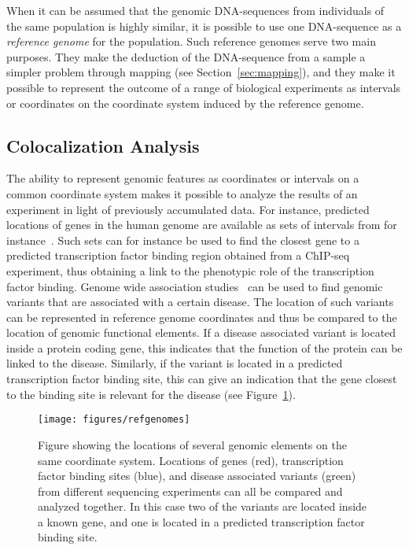 When it can be assumed that the genomic DNA-sequences from individuals of the same population is highly similar, it is possible to use one DNA-sequence as a \emph{reference genome} for the population.
Such reference genomes serve two main purposes.
They make the deduction of the DNA-sequence from a sample a simpler problem through mapping (see Section~\ref{sec:mapping}), and they make it possible to represent the outcome of a range of biological experiments as intervals or coordinates on the coordinate system induced by the reference genome. 

\subsection{Colocalization Analysis}
The ability to represent genomic features as coordinates or intervals on a common coordinate system makes it possible to analyze the results of an experiment in light of previously accumulated data.
For instance, predicted locations of genes in the human genome are available as sets of intervals from for instance~\cite{genelist}.
Such sets can for instance be used to find the closest gene to a predicted transcription factor binding region obtained from a ChIP-seq experiment, thus obtaining a link to the phenotypic role of the transcription factor binding.
Genome wide association studies~\cite{gwas} can be used to find genomic variants that are associated with a certain disease.
The location of such variants can be represented in reference genome coordinates and thus be compared to the location of genomic functional elements.
If a disease associated variant is located inside a protein coding gene, this indicates that the function of the protein can be linked to the disease.
Similarly, if the variant is located in a predicted transcription factor binding site, this can give an indication that the gene closest to the binding site is relevant for the disease (see Figure~\ref{fig:refpos}).
\begin{figure}
  \texttt{[image: figures/refgenomes]}
  \caption{Figure showing the locations of several genomic elements on the same coordinate system.
    Locations of genes (red), transcription factor binding sites (blue), and disease associated variants (green) from different sequencing experiments can all be compared and analyzed together.
    In this case two of the variants are located inside a known gene, and one is located in a predicted transcription factor binding site.
  }
  \label{fig:refpos}

\end{figure}

